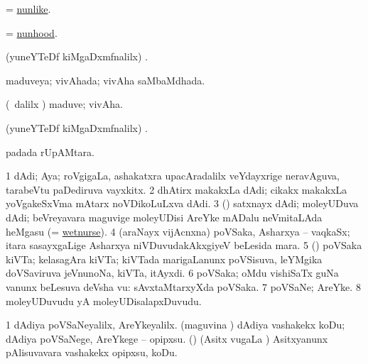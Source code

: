 \bentry
{}
\gl{\gu}
\bmng
= \hyperlink{nunlike}{nunlike}. 
\emng
\eentry


\bentry
{}
\gl{\nA}
\bmng
= \hyperlink{nunhood}{nunhood}. 
\emng
\eentry

\bentry
{}
\gl{\saMkiSx}
\bmng
(yuneYTeDf kiMgaDxmfnalilx) . 
\emng
\eentry

\bentry
{}
\gl{\gu}
\bmng
maduveya; vivAhada; vivAha saMbaMdhada. 
\emng
\eentry

\bentry
{}
\gl{\nA}
\bmng
(\sA\ \bava dalilx \parx) maduve; vivAha. 
\emng
\eentry

\bentry
{}
\gl{\saMkiSx}
\bmng
(yuneYTeDf kiMgaDxmfnalilx) . 
\emng
\eentry

\bentry
{}
\bmng
{} padada rUpAMtara. 
\emng
\eentry

\bentry
{}
\gl{\nA}
\bmng
\bnum
\num{1} dAdi; Aya; roVgigaLa, ashakatxra upacAradalilx veYdayxrige neravAguva, tarabeVtu paDediruva vayxkitx. 
\num{2} dhAtirx makakxLa dAdi; cikakx makakxLa yoVgakeSxVma mAtarx noVDikoLuLxva dAdi. 
\num{3} (\pArxparx) satxnayx dAdi; moleyUDuva dAdi; beVreyavara maguvige moleyUDisi AreYke mADalu neVmitaLAda heMgasu (= \hyperref{kandict_w.pdf}{W}{wet-nurse(1)}{wetnurse}). 
\num{4} (araNayx vijAcnxna) poVSaka, Asharxya -- vaqkaSx; itara sasayxgaLige Asharxya niVDuvudakAkxgiyeV beLesida mara. 
\num{5} (\pArxvi) poVSaka kiVTa; kelasagAra kiVTa; kiVTada marigaLanunx poVSisuva, leYMgika doVSaviruva jeVnunoNa, kiVTa, itAyxdi. 
\num{6} poVSaka; oMdu vishiSaTx guNa \mo vanunx beLesuva deVsha \mo vu:  sAvxtaMtarxyXda poVSaka. 
\num{7} poVSaNe; AreYke. 
\num{8} moleyUDuvudu yA moleyUDisalapxDuvudu. 
\enum
\emng

\noindent
\gl{\pagu}
\bmng
\bnum
\num{1}  dAdiya poVSaNeyalilx, AreYkeyalilx. 
  
\banum
{} (maguvina \vi) dAdiya vashakekx koDu; dAdiya poVSaNege, AreYkege -- opipxsu. 
 (\rUpa) (Asitx \mo vugaLa \vi) Asitxyanunx pAlisuvavara vashakekx opipxsu, koDu. 
\eanum
\numie
\enum
\emng
\eentry

